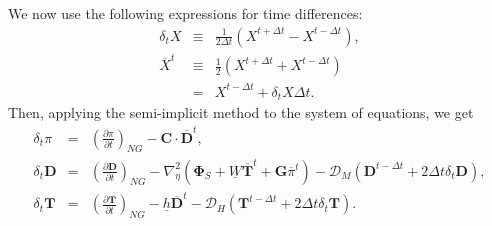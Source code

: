 We now use the following expressions for time differences:
\begin{eqnarray}
  \delta_{t} {X} &\equiv & \frac{1}{2 \Delta t}
        \left( {X}^{t+\Delta t} - {X}^{t-\Delta t} \right), \\
    \overline{X}^{t} &\equiv & \frac{1}{2} \left( {X}^{t+\Delta t}  + {X}^{t-\Delta t} \right) \\
  &=&  {X}^{t-\Delta t} + \delta_{t} {X} \Delta t.
\end{eqnarray}
Then, applying the semi-implicit method to the system of equations, we get
\begin{eqnarray}
\label{eqn_for_pi}
  \delta_{t} \pi &=&
          \left( \frac{\partial \pi}{\partial t} \right)_{NG}
     - {\mathbf{C}} \cdot \overline{ {\mathbf{D}} }^{t}, \\
  \delta_{t} {\mathbf{D}} &=&
          \left( \frac{\partial {\mathbf{D}}}{\partial t} \right)_{NG}
          - \nabla^{2}_{\eta} ( {\mathbf{\Phi}}_{S}
                                  + \underline{W}
                                     \overline{ {\mathbf{T}} }^{t}
                                  + {\mathbf{G}}
                                  \overline{\pi}^{t} )
          - {\mathcal D}_M ( {\mathbf{D}}^{t-\Delta t}
                         + 2 \Delta t \delta_{t} {\mathbf{D}} ), \\
\label{eqn_for_t}
  \delta_{t} {\mathbf{T}} &=&
        \left( \frac{\partial {\mathbf{T}}}{\partial t} \right)_{NG}
         - \underline{h} \overline{ {\mathbf{D}} }^{t}
         - {\mathcal D}_H ( {\mathbf{T}}^{t-\Delta t}
                        + 2 \Delta t \delta_{t} {\mathbf{T}} ).
\end{eqnarray}


